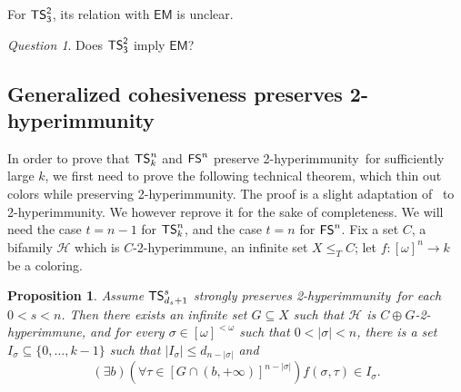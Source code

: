 \documentclass{amsart}
\newtheorem{proposition}[theorem]{Proposition}
\theoremstyle{definition}
\theoremstyle{remark}
\newtheorem {question}[theorem]{Question}
\numberwithin{equation}{section}
\theoremstyle{noparens}
\def\propertyL{2-hyperimmunity}
\def\hyper{2-hyperimmune}
\def\msf{\mathsf}
\newcommand{\Hcal}{\mathcal{H}}
\newcommand{\card}[1]{\left| #1 \right|}
\newcommand{\s}[1]{\ensuremath{\sf{#1}}}
\DeclareMathOperator{\ts}{\s{TS}}
\DeclareMathOperator{\fs}{\s{FS}}
\begin{document}
For $\msf{\ts^2_3}$, its relation with $\msf{EM}$ is unclear.
\begin{question}
Does $\msf{\ts^2_3}$ imply $\msf{EM}$?
\end{question}


\subsection{Generalized cohesiveness preserves \propertyL}

In order to  prove that $\ts^n_k$ and $\fs^n$ preserve \propertyL\ for sufficiently
large $k$, we first need to prove the following technical theorem, which thin out colors
while preserving \propertyL.
The proof is a slight adaptation of~\cite{PateyCombinatorial} to \propertyL.
We however reprove it for the sake of completeness. We will need the case $t = n-1$
for $\ts^n_k$, and the case $t = n$ for $\fs^n$.
Fix a set  $C$, a bifamily $\Hcal$ which is $C$-\hyper,
an infinite set $X\leq_T C$; let $f : [\omega]^n \to k$ be a coloring.
\begin{proposition}\label{thm:gen-coh-double-immmunity}
Assume $\ts^s_{d_s+1}$ strongly preserves \propertyL\ for each  $0<s<n$.
Then there exists an infinite set $G\subseteq X$ such that $\Hcal$ is $C \oplus G$-\hyper,
and for every $\sigma \in [\omega]^{<\omega}$ such that $0< \card{\sigma} < n$,
there is a set $I_\sigma \subseteq \{0, \dots, k-1\}$ such that $|I_\sigma| \leq d_{n-|\sigma|}$ and
$$
(\exists b)(\forall \tau \in [G \cap (b, +\infty)]^{n-|\sigma|}) f(\sigma, \tau) \in I_\sigma.
$$
\end{proposition}
\end{document}
